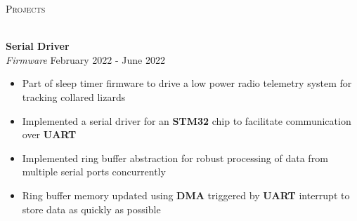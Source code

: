 \documentclass[a4paper]{article}
\newcommand{\lineunder} {
    \vspace*{-8pt} \\
    \hspace*{-18pt} \hrulefill \\
}
\newcommand{\header} [1] {
    {\hspace*{-18pt}\vspace*{6pt} \textsc{#1}}
    \vspace*{-6pt} \lineunder
}
\newenvironment{entry}[4][]{
  \textbf{#2} \hfill #1 \\
  \textit{#3} \hfill #4 \\
  \vspace{-2mm}
  \begin{itemize} \itemsep 0em
  }
  {
  \end{itemize}
}
\begin{document}
\header{Projects}
\vspace{1mm}

\begin{comment}
\begin{entry}{Visual SLAM}{Software}{March 2022} 
\item Implemented simultaneous localization and mapping using stereo video and IMU data 
\item Implemented an extended Kalman filter to more accurately predict the car position based on sensor readings
\item Used IMU data for prediction step and stereo video for update step 

\end{entry}
\end{comment}

\begin{entry}{Serial Driver}{Firmware}{February 2022 - June 2022}
\item Part of sleep timer firmware to drive a low power radio telemetry system
  for tracking collared lizards
\item Implemented a serial driver for an \textbf{STM32} chip to facilitate
  communication over \textbf{UART}
\item Implemented ring buffer abstraction for robust processing of data from multiple serial ports concurrently
\item Ring buffer memory updated using \textbf{DMA} triggered by \textbf{UART}
  interrupt to store data as quickly as possible
\end{entry}
\end{document}
